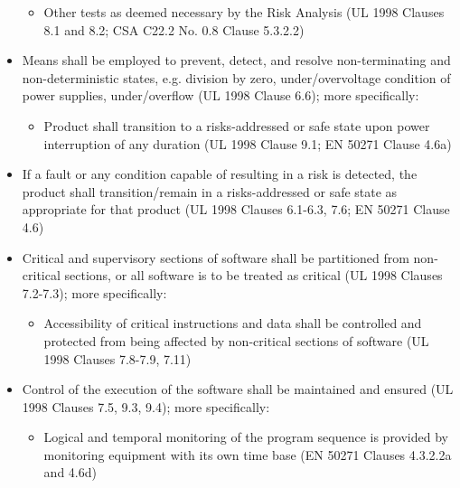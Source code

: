 \documentclass[12pt]{../Common_files/ElisaPaper}
\begin{document}
\begin{itemize}
\begin{itemize}
\item Other tests as deemed necessary by the Risk Analysis (UL 1998 \cite{UL1998} Clauses 8.1 and 8.2; CSA C22.2 No. 0.8 \cite{CSA0.8} Clause 5.3.2.2)

\end{itemize}

\item Means shall be employed to prevent, detect, and resolve non-terminating and non-deterministic states, e.g. division by zero, under/overvoltage condition of power supplies, under/overflow (UL 1998 \cite{UL1998} Clause 6.6); more specifically:

\begin{itemize}

\item Product shall transition to a risks-addressed or safe state upon power interruption of any duration (UL 1998 \cite{UL1998} Clause 9.1; EN 50271 \cite{EN50271} Clause 4.6a)

\end{itemize}

\item If a fault or any condition capable of resulting in a risk is detected, the product shall transition/remain in a risks-addressed or safe state as appropriate for that product (UL 1998 \cite{UL1998} Clauses 6.1-6.3, 7.6; EN 50271 \cite{EN50271} Clause 4.6)

\item Critical and supervisory sections of software shall be partitioned from non-critical sections, or all software is to be treated as critical (UL 1998 \cite{UL1998} Clauses 7.2-7.3); more specifically:

\begin{itemize}

\item Accessibility of critical instructions and data shall be controlled and protected from being affected by non-critical sections of software (UL 1998 \cite{UL1998} Clauses 7.8-7.9, 7.11)

\end{itemize}

\item Control of the execution of the software shall be maintained and ensured (UL 1998 \cite{UL1998} Clauses 7.5, 9.3, 9.4); more specifically:

\begin{itemize}

\item Logical and temporal monitoring of the program sequence is provided by monitoring equipment with its own time base (EN 50271 \cite{EN50271} Clauses 4.3.2.2a and 4.6d)


\end{itemize}
\end{itemize}
\end{document}
